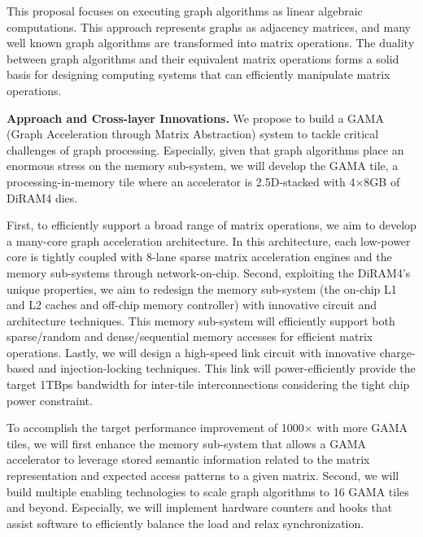\noindent
This proposal focuses on executing graph algorithms as linear algebraic computations. 
This approach represents graphs as adjacency matrices, and many well known graph algorithms are transformed into matrix operations. 
The %
duality between graph algorithms and their equivalent matrix operations forms a solid basis for designing computing systems that can efficiently manipulate matrix operations. 

\vspace{3pt}
\noindent
\textbf{Approach and Cross-layer Innovations.} 
We propose to build a GAMA (Graph Acceleration through Matrix Abstraction) system to tackle critical challenges of graph processing. 
Especially, given that graph algorithms place an enormous stress on the memory sub-system, 
we will develop the GAMA tile, a processing-in-memory tile where an accelerator is 2.5D-stacked with 4$\times$8GB of DiRAM4 dies.

First, to efficiently support a broad range of matrix operations, we aim to develop a many-core graph acceleration architecture. 
In this architecture, each low-power core is tightly coupled with 8-lane sparse matrix acceleration engines and the memory sub-systems through network-on-chip.
Second, exploiting the DiRAM4's unique properties, we aim to redesign the memory sub-system (the on-chip L1 and L2 caches and off-chip memory controller) with innovative circuit and architecture techniques. 
This memory sub-system will efficiently support both sparse/random and dense/sequential memory accesses for efficient matrix operations. 
Lastly, we will design a high-speed link circuit with innovative charge-based and injection-locking techniques. 
This link will power-efficiently provide the target 1TBps bandwidth for inter-tile interconnections considering the tight chip power constraint.


To accomplish the target performance improvement of 1000$\times$ with more GAMA tiles, %
we will first enhance the memory sub-system that allows a GAMA accelerator to leverage 
stored semantic information related to the matrix representation and expected access patterns to a given matrix.   
Second, we will build multiple enabling technologies to scale graph algorithms to 16 GAMA tiles and beyond. 
Especially, we will implement hardware counters and hooks that assist software to efficiently balance the load and relax synchronization.


